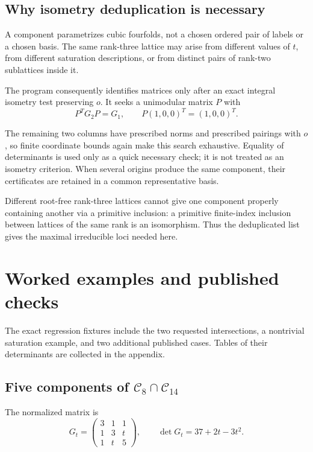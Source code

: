 \documentclass[
  american,
  11pt,
  a4paper,
]{article}
\begin{document}
\subsection{Why isometry deduplication is
necessary}\label{why-isometry-deduplication-is-necessary}

A component parametrizes cubic fourfolds, not a chosen ordered pair of
labels or a chosen basis. The same rank-three lattice may arise from
different values of \(t\), from different saturation descriptions, or
from distinct pairs of rank-two sublattices inside it.

The program consequently identifies matrices only after an exact
integral isometry test preserving \(o\). It seeks a unimodular matrix
\(P\) with
\[P^TG_2P=G_1,\qquad P(1,0,0)^T=(1,0,0)^T.\]

The remaining two columns have prescribed norms and prescribed pairings
with \(o\), so finite coordinate bounds again make this search
exhaustive. Equality of determinants is used only as a quick necessary
check; it is not treated as an isometry criterion. When several origins
produce the same component, their certificates are retained in a common
representative basis.

Different root-free rank-three lattices cannot give one component
properly containing another via a primitive inclusion: a primitive
finite-index inclusion between lattices of the same rank is an
isomorphism. Thus the deduplicated list gives the maximal irreducible
loci needed here.

\section{Worked examples and published
checks}\label{worked-examples-and-published-checks}

The exact regression fixtures include the two requested intersections, a
nontrivial saturation example, and two additional published cases.
Tables of their determinants are collected in the appendix.

\subsection{\texorpdfstring{Five components of
\(\mathcal C_8\cap\mathcal C_{14}\)}{Five components of \textbackslash mathcal C\_8\textbackslash cap\textbackslash mathcal C\_\{14\}}}\label{five-components-of-mathcal-c_8capmathcal-c_14}

The normalized matrix is
\[G_t=\begin{pmatrix}3&1&1\\1&3&t\\1&t&5\end{pmatrix},
\qquad\det G_t=37+2t-3t^2.\]
\end{document}
